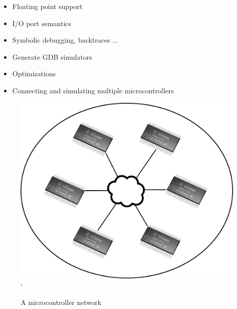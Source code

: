 \begin{block}{\large {}\vphantom{Future Work}}
    \begin{itemize}
        \item Floating point support
        \item I/O port semantics
        \item Symbolic debugging, backtraces ...
        \item Generate GDB simulators
        \item Optimizations
		\item Connecting and simulating multiple microcontrollers
    \end{itemize}
	\begin{figure}
		\caption{A microcontroller network}
		\includegraphics[width=\linewidth]{figures/netwerk.png}`
	\end{figure}
\end{block}
